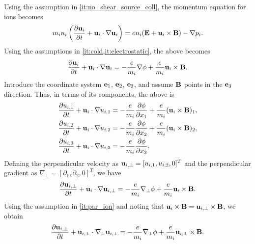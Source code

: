 \documentclass[oneside,a4paper,11pt]{report}
\begin{document}
Using the assumption in \cref{it:no_shear_source_coll}, the momentum equation for ions becomes
\begin{equation}
    m_i n_i \left (\frac{\partial \mathbf{u}_i}{\partial t} + \mathbf{u}_i \cdot \nabla \mathbf{u}_i \right ) = e n_i (\mathbf{E} + \mathbf{u}_i \times \mathbf{B}) - \nabla p_i.
\end{equation}
Using the assumptions in \cref{it:cold,it:electrostatic}, the above becomes
\begin{equation}
    \frac{\partial \mathbf{u}_i}{\partial t} + \mathbf{u}_i \cdot \nabla \mathbf{u}_i = -\frac{e}{m_i} \nabla \phi + \frac{e}{m_i}\mathbf{u}_i \times \mathbf{B}.
\end{equation}
Introduce the coordinate system $\mathbf{e}_1$, $\mathbf{e}_2$, $\mathbf{e}_3$, and assume $\mathbf{B}$ points in the $\mathbf{e}_3$ direction. Thus, in terms of its components, the above is
\begin{align}
    \frac{\partial u_{i,1}}{\partial t} + \mathbf{u}_i \cdot \nabla u_{i,1} &= -\frac{e}{m_i} \frac{\partial \phi}{\partial x_1} + \frac{e}{m_i} (\mathbf{u}_i \times \mathbf{B})_1, \nonumber \\
    \frac{\partial u_{i,2}}{\partial t} + \mathbf{u}_i \cdot \nabla u_{i,2} &= -\frac{e}{m_i} \frac{\partial \phi}{\partial x_2} + \frac{e}{m_i} (\mathbf{u}_i \times \mathbf{B})_2, \nonumber \\
    \frac{\partial u_{i,3}}{\partial t} + \mathbf{u}_i \cdot \nabla u_{i,3} &= -\frac{e}{m_i} \frac{\partial \phi}{\partial x_3}.
\end{align}
Defining the perpendicular velocity as $\mathbf{u}_{i,\perp} = [u_{i,1}, u_{i,2}, 0]^T$ and the perpendicular gradient as $\nabla_\perp = [\partial_1, \partial_2, 0]^T$, we have
\begin{equation}
    \frac{\partial \mathbf{u}_{i,\perp}}{\partial t} + \mathbf{u}_i \cdot \nabla \mathbf{u}_{i,\perp} = -\frac{e}{m_i} \nabla_\perp \phi + \frac{e}{m_i}\mathbf{u}_i \times \mathbf{B}.
\end{equation}
Using the assumption in \cref{it:par_ion} and noting that $\mathbf{u}_{i} \times \mathbf{B} = \mathbf{u}_{i,\perp} \times \mathbf{B}$, we obtain
\begin{equation}
\label{eq:momentum_perpendicular}
    \frac{\partial \mathbf{u}_{i,\perp}}{\partial t} + \mathbf{u}_{i,\perp} \cdot \nabla_\perp \mathbf{u}_{i,\perp} = -\frac{e}{m_i} \nabla_\perp \phi + \frac{e}{m_i} \mathbf{u}_{i,\perp} \times \mathbf{B}.
\end{equation}
\end{document}
